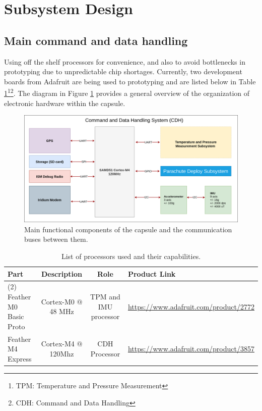 \documentclass{article}
\begin{document}
\section{Subsystem Design}
\label{sec:ss-design}

\subsection{Main command and data handling}

Using off the shelf processors for convenience, and also to avoid bottlenecks in prototyping due to unpredictable chip shortages. Currently, two development boards from Adafruit are being used to prototyping and are listed below in Table \ref{tab:processors}\footnote{TPM: Temperature and Pressure Measurement}\footnote{CDH: Command and Data Handling}. The diagram in Figure \ref{fig:main-overview} provides a general overview of the organization of electronic hardware within the capsule. 

\begin{figure}[h!]
	\centering
	\includegraphics[width=\textwidth]{images/amtps-main-system.png}
	\caption{Main functional components of the capsule and the communication buses between them.}
	\label{fig:main-overview}
\end{figure}


\begin{table}[h!]	
	\caption{List of processors used and their capabilities.}
	\begin{tabular}{l | c c m{5cm}}
		Part & Description & Role & Product Link \\
		\hline
		(2) Feather M0 Basic Proto & Cortex-M0 @ 48 MHz & TPM and IMU processor & \url{https://www.adafruit.com/product/2772}\\
		Feather M4 Express & Cortex-M4 @ 120Mhz & CDH Processor & \url{https://www.adafruit.com/product/3857} 
	\end{tabular}
	\label{tab:processors}
\end{table}
\end{document}
